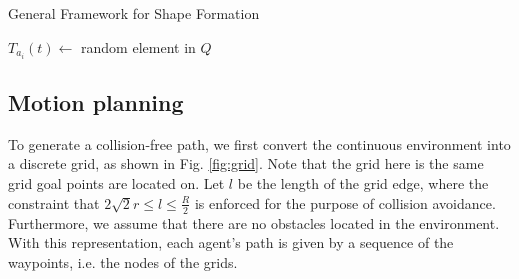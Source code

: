 \documentclass[journal]{IEEEtran}
\begin{document}
\begin{algorithm}[t]
\caption{General Framework for Shape Formation}
\DontPrintSemicolon
\label{al1}
\small
{}
$T_{a_i}(t) \gets $ random element in $Q$\;
\end{algorithm}




\subsection{Motion planning}

To generate a collision-free path, we first convert the continuous environment into a discrete grid, as shown in Fig. \ref{fig:grid}. Note that the grid here is the same grid goal points are located on.  Let $l$ be the length of the grid edge, where the constraint that $2\sqrt{2}r\leq l \leq \frac{R}{2}$ is enforced for the purpose of collision avoidance. Furthermore, we assume that there are no obstacles located in the environment. With this representation, each agent's path is given by a sequence of the waypoints, i.e. the nodes of the grids.
\end{document}
